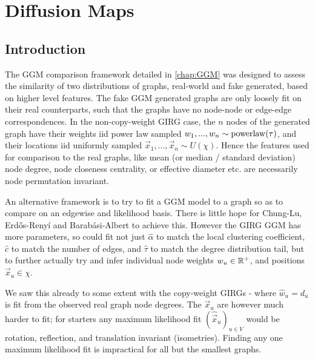 \chapter{Diffusion Maps}
\label{chap:diff_maps}
\minitoc
\section{Introduction}

The GGM comparison framework detailed in \cref{chap:GGM} was designed to assess the similarity of two distributions of graphs, real-world and fake generated, based on higher level features. The fake GGM generated graphs are only loosely fit on their real counterparts, such that the graphs have no node-node or edge-edge correspondences. In the non-copy-weight GIRG case, the $n$ nodes of the generated graph have their weights iid power law sampled $w_1, ..., w_n \sim \operatorname{powerlaw}(\tau)$, and their locations iid uniformly sampled $\vec{x}_1, ..., \vec{x}_n \sim U(\chi)$. Hence the features used for comparison to the real graphs, like mean (or median / standard deviation) node degree, node closeness centrality, or effective diameter etc. are necessarily node permutation invariant.

An alternative framework is to try to fit a GGM model to a graph so as to compare on an edgewise and likelihood basis. There is little hope for Chung-Lu, Erd\H{o}s-Reny{\'i} and Barab{\'a}si-Albert to achieve this. However the GIRG GGM has more parameters, so could fit not just $\hat{\alpha}$ to match the local clustering coefficient, $\hat{c}$ to match the number of edges, and $\hat{\tau}$ to match the degree distribution tail, but to further actually try and infer individual node weights $w_u \in \mathbb{R}^+$, and positions $\vec{x}_u \in \chi$. 

We saw this already to some extent with the copy-weight GIRGs - where $\hat{w}_u = d_u$ is fit from the observed real graph node degrees. The $\vec{x}_u$ are however much harder to fit; for starters any maximum likelihood fit $(\hat{\vec{x}}_u)_{u \in V}$ would be rotation, reflection, and translation invariant (isometries). Finding any one maximum likelihood fit is impractical for all but the smallest graphs.


